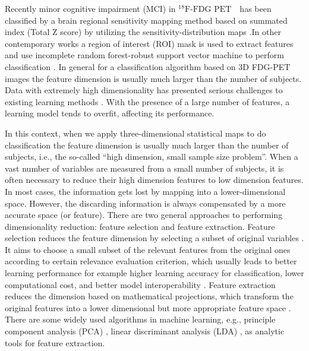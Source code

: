 \documentclass[authoryear,preprint,revi	ew,12pt]{elsarticle}
\newcommand{\FDGPET}   {$ ^{18}\textrm{F-FDG PET} $~}
\begin{document}
Recently minor cognitive impairment (MCI) in \FDGPET ~has been classified by a brain regional sensitivity mapping method based on summated index (Total Z score) by utilizing the sensitivity-distribution maps \citep{kakimoto2011new}.In other contemporary works a region of interest (ROI) mask is used to extract features and use incomplete random forest-robust support vector machine to perform classification \citep{lu2017early}. In general for a classification algorithm based on 3D FDG-PET images the feature dimension is usually much larger than the number of subjects. Data with extremely high dimensionality has presented serious challenges to existing learning methods \citep{liu2007computational, friedman2001elements}. With the presence of a large number of features, a learning model tends to overfit, affecting its performance.

In this context, when we apply three-dimensional statistical maps to do classification the feature dimension is usually much larger than the number of subjects, i.e., the so-called “high dimension, small sample size problem”. When a vast number of variables are measured from a small number of subjects, it is often necessary to reduce their high dimension features to low dimension features. In most cases, the information gets lost by mapping into a lower-dimensional space. However, the discarding information is always compensated by a more accurate space (or feature). There are two general approaches to performing dimensionality reduction: feature selection and feature extraction. Feature selection reduces the feature dimension by selecting a subset of original variables \citep{jain1997feature}. It aims to choose a small subset of the relevant features from the original ones according to certain relevance evaluation criterion, which usually leads to better learning performance for example higher learning accuracy for classification, lower computational cost, and better model interoperability \citep{tang2014feature}. Feature extraction reduces the dimension based on mathematical projections, which transform the original features into a lower dimensional but more appropriate feature space \citep{guyon2008feature}. There are some widely used algorithms in machine learning, e.g., principle component analysis (PCA) \citep{jolliffe2002principal}, linear discriminant analysis (LDA) \citep{mika1999fisher}, as analytic tools for feature extraction.
\end{document}
